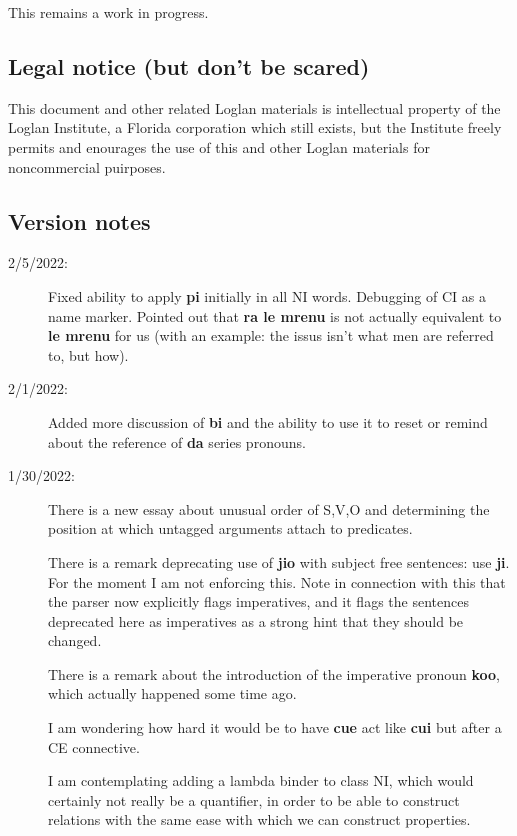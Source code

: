 \documentclass[12pt]{book}
\begin{document}
This remains a work in progress.

\subsection{Legal notice (but don't be scared)}

This document and other related Loglan materials is intellectual property of the Loglan Institute, a Florida corporation which still exists, but the Institute freely permits and enourages the use of this and other Loglan materials for noncommercial puirposes.

\subsection{Version notes}

\begin{description}

\item[2/5/2022:]  Fixed ability to apply {\bf pi} initially in all NI words.  Debugging of CI as a name marker.  Pointed out that {\bf ra le mrenu} is not actually equivalent to {\bf le mrenu} for us (with an example:  the issus isn't what men are referred to, but how).

\item[2/1/2022:]  Added more discussion of {\bf bi} and the ability to use it to reset or remind about the reference of {\bf da} series pronouns.

\item[1/30/2022:]  There is a new essay about unusual order of S,V,O and determining the position at which untagged arguments attach to predicates.

There is a remark deprecating use of {\bf jio} with subject free sentences:  use {\bf ji}.  For the moment I am not enforcing this.  Note in connection with this that the parser now explicitly flags imperatives, and it flags the sentences deprecated here as imperatives as a strong hint that they should be changed.

There is a remark about the introduction of the imperative pronoun {\bf koo}, which actually happened some time ago.

I am wondering how hard it would be to have {\bf cue} act like {\bf cui} but after a CE connective.

I am contemplating adding a lambda binder to class NI, which would certainly not really be a quantifier, in order to be able to construct relations with the same ease with which we can construct properties.


\end{description}
\end{document}
